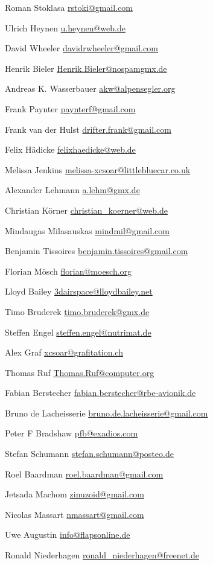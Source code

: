 \item Roman Stoklasa \url{rstoki@gmail.com}
\item Ulrich Heynen \url{u.heynen@web.de}
\item David Wheeler \url{davidrwheeler@gmail.com}
\item Henrik Bieler \url{Henrik.Bieler@nospamgmx.de}
\item Andreas K. Wasserbauer \url{akw@alpensegler.org}
\item Frank Paynter \url{paynterf@gmail.com}
\item Frank van der Hulst \url{drifter.frank@gmail.com}
\item Felix Hädicke \url{felixhaedicke@web.de}
\item Melissa Jenkins \url{melissa-xcsoar@littlebluecar.co.uk}
\item Alexander Lehmann \url{a.lehm@gmx.de}
\item Christian Körner \url{christian_koerner@web.de}
\item Mindaugas Milasauskas \url{mindmil@gmail.com}
\item Benjamin Tissoires \url{benjamin.tissoires@gmail.com}
\item Florian Mösch \url{florian@moesch.org}
\item Lloyd Bailey \url{3dairspace@lloydbailey.net}
\item Timo Bruderek \url{timo.bruderek@gmx.de}
\item Steffen Engel \url{steffen.engel@nutrimat.de}
\item Alex Graf \url{xcsoar@grafitation.ch}
\item Thomas Ruf \url{Thomas.Ruf@computer.org}
\item Fabian Berstecher \url{fabian.berstecher@rbe-avionik.de}
\item Bruno de Lacheisserie \url{bruno.de.lacheisserie@gmail.com}
\item Peter F Bradshaw \url{pfb@exadios.com}
\item Stefan Schumann \url{stefan.schumann@posteo.de}
\item Roel Baardman \url{roel.baardman@gmail.com}
\item Jetsada Machom \url{zinuzoid@gmail.com}
\item Nicolas Massart \url{nmassart@gmail.com}
\item Uwe Augustin \url{info@flapsonline.de}
\item Ronald Niederhagen \url{ronald_niederhagen@freenet.de}

